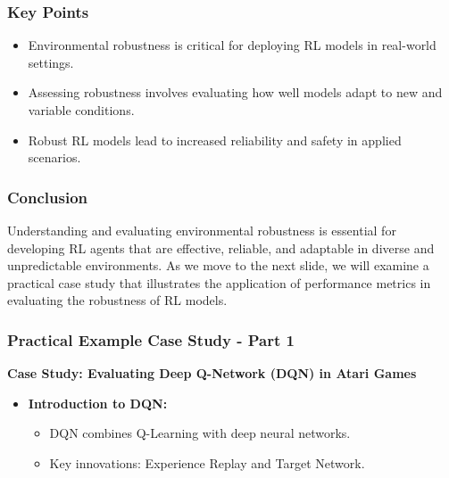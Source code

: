 \documentclass{beamer}
\begin{document}
\begin{frame}[fragile]
    \frametitle{Key Points}
    \begin{itemize}
        \item Environmental robustness is critical for deploying RL models in real-world settings.
        \item Assessing robustness involves evaluating how well models adapt to new and variable conditions.
        \item Robust RL models lead to increased reliability and safety in applied scenarios.
    \end{itemize}
\end{frame}

\begin{frame}[fragile]
    \frametitle{Conclusion}
    Understanding and evaluating environmental robustness is essential for developing RL agents that are effective, reliable, and adaptable in diverse and unpredictable environments. As we move to the next slide, we will examine a practical case study that illustrates the application of performance metrics in evaluating the robustness of RL models.
\end{frame}

\begin{frame}[fragile]
    \frametitle{Practical Example Case Study - Part 1}
    \textbf{Case Study: Evaluating Deep Q-Network (DQN) in Atari Games}
    
    \begin{itemize}
        \item \textbf{Introduction to DQN:}
        \begin{itemize}
            \item DQN combines Q-Learning with deep neural networks.
            \item Key innovations: Experience Replay and Target Network.
        \end{itemize}
    \end{itemize}
\end{frame}
\end{document}

